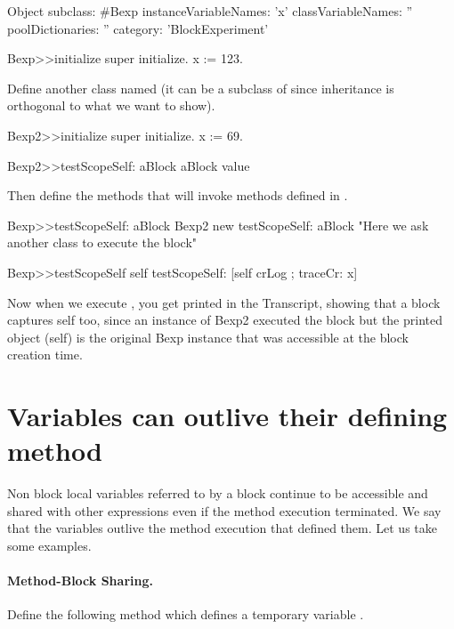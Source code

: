 \documentclass[a4paper,10pt,twoside]{book}
\begin{document}
\begin{code}{}
Object subclass: #Bexp
	instanceVariableNames: 'x'
	classVariableNames: ''
	poolDictionaries: ''
	category: 'BlockExperiment'

Bexp>>initialize
    super initialize.
	x := 123.
\end{code}

Define another class named  (it can be a subclass of  since inheritance is orthogonal to what we want to show).
\begin{code}{}
Bexp2>>initialize
	super initialize.
	x := 69.

Bexp2>>testScopeSelf: aBlock
	aBlock value
\end{code}

Then define the methods that will invoke  methods defined in .
\begin{code}{}
Bexp>>testScopeSelf: aBlock
	Bexp2 new testScopeSelf: aBlock "Here we ask another class to execute the block"

Bexp>>testScopeSelf
	self testScopeSelf: [self crLog ; traceCr: x]
\end{code}

Now when we execute , you get  printed in the Transcript, showing that a block captures self too, since an instance of Bexp2 executed the block but the printed object (self) is the original Bexp instance that was accessible at the block creation time.


\section{Variables can outlive their defining method}

Non block local variables referred to by a block continue to be accessible and shared with other expressions even if the method execution terminated. We say that the variables outlive the method execution that defined them.
Let us take some examples.

\paragraph{Method-Block Sharing.} Define the following method  which defines a temporary variable .
\end{document}
